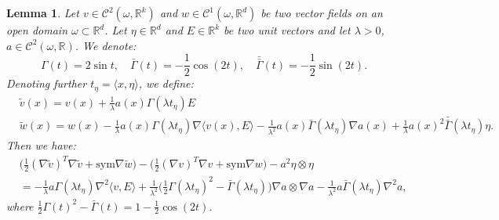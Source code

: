 \documentclass[reqno,twoside,11pt]{amsart}
\newcommand{\sym}{\mathrm{sym}}
\newcommand{\R}{\mathbb{R}}
\newcommand*{\dbar}[1]{\bar{\bar{#1}}}
\numberwithin{equation}{section}
\theoremstyle{plain}
\newtheorem{lemma}[theorem]{Lemma}
\theoremstyle{definition}
\begin{document}
\begin{lemma}\label{lem_step}
Let $v\in \mathcal{C}^2(\omega, \R^{k})$ and $w\in
\mathcal{C}^1(\omega, \R^{d})$ be two vector fields on an open domain $\omega\subset\R^d$.
Let $\eta\in\R^d$ and $E\in \R^k$ be two unit vectors and let
$\lambda>0$, $a\in \mathcal{C}^2(\omega,\R)$. We denote:
\begin{equation}\label{tripl_def}
\Gamma(t) = 2\sin t,\quad \bar\Gamma(t) = -\frac{1}{2}\cos (2t), \quad
\dbar\Gamma(t) = -\frac{1}{2}\sin (2t).
\end{equation}
Denoting further $t_\eta = \langle x,\eta\rangle$, we define:
\begin{equation}\label{defi_per}
\begin{split}
&\tilde v(x) = v(x) + \frac{1}{\lambda}a(x) \Gamma(\lambda t_\eta)E\\
& \tilde w(x) = w(x) -\frac{1}{\lambda}a(x) \Gamma(\lambda t_\eta)\nabla \langle v(x), E\rangle - 
\frac{1}{\lambda^2} a(x) \bar\Gamma(\lambda t_\eta)\nabla a(x)
+ \frac{1}{\lambda}a(x)^2 \dbar\Gamma(\lambda t_\eta)\eta.
\end{split}
\end{equation}
Then we have:
\begin{equation}\label{step_err}
\begin{split}
& \big(\frac{1}{2}(\nabla \tilde v)^T \nabla \tilde v + \sym\nabla \tilde w\big) - 
\big(\frac{1}{2}(\nabla v)^T \nabla v + \sym\nabla w\big) - a^2\eta\otimes\eta 
\\ & = -\frac{1}{\lambda} a \Gamma(\lambda t_\eta)\nabla^2 \langle v, E\rangle +
\frac{1}{\lambda^2}\big(\frac{1}{2}\Gamma(\lambda
t_\eta)^2-\bar\Gamma(\lambda t_\eta)\big) \nabla a\otimes\nabla a -
\frac{1}{\lambda^2}a \bar\Gamma(\lambda t_\eta)\nabla^2a,
\end{split}
\end{equation}
where $\frac{1}{2}\Gamma(t)^2 -\bar\Gamma(t) = 1-\frac{1}{2}\cos(2t)$.
\end{lemma}
\end{document}
